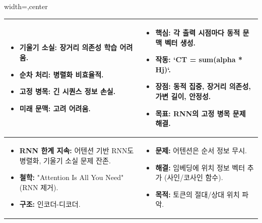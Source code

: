 \documentclass[11pt,a4paper]{article}
\begin{document}
\begin{adjustbox}{width=\textwidth,center}
\begin{tabular}{p{}p{}}
\toprule
\begin{conceptbox}[title={RNN의 한계}]
\begin{itemize}
    \item \textbf{기울기 소실:} 장거리 의존성 학습 어려움.
    \item \textbf{순차 처리:} 병렬화 비효율적.
    \item \textbf{고정 병목:} 긴 시퀀스 정보 손실.
    \item \textbf{미래 문맥:} 고려 어려움.
\end{itemize}
\end{conceptbox}
&
\begin{conceptbox}[title={어텐션 메커니즘}]
\begin{itemize}
    \item \textbf{핵심:} 각 출력 시점마다 동적 문맥 벡터 생성.
    \item \textbf{작동:} `CT = sum(alpha * Hj)`.
    \item \textbf{장점:} 동적 집중, 장거리 의존성, 가변 길이, 안정성.
    \item \textbf{목표:} RNN의 고정 병목 문제 해결.
\end{itemize}
\end{conceptbox} \\
\midrule
\begin{conceptbox}[title={트랜스포머 등장 배경}]
\begin{itemize}
    \item \textbf{RNN 한계 지속:} 어텐션 기반 RNN도 병렬화, 기울기 소실 문제 잔존.
    \item \textbf{철학:} "Attention Is All You Need" (RNN 제거).
    \item \textbf{구조:} 인코더-디코더.
\end{itemize}
\end{conceptbox}
&
\begin{conceptbox}[title={위치 인코딩}]
\begin{itemize}
    \item \textbf{문제:} 어텐션은 순서 정보 무시.
    \item \textbf{해결:} 임베딩에 위치 정보 벡터 추가 (사인/코사인 함수).
    \item \textbf{목적:} 토큰의 절대/상대 위치 파악.
\end{itemize}
\end{conceptbox} \\

\end{tabular}
\end{adjustbox}
\end{document}
